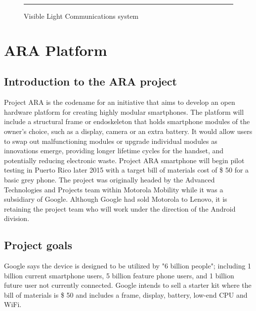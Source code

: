 \begin{figure}[ht]
  \centering
    \rule{35em}{0.5pt}
  \caption[VLC Receiver front-end circuit]{Visible Light Communications system}
  \label{fig:RxCircuit}
\end{figure}

\section{ARA Platform}
\subsection{Introduction to the ARA project}

Project ARA is the codename for an initiative that aims to develop an open hardware platform for creating highly modular smartphones. The platform will include a structural frame or endoskeleton that holds smartphone modules of the owner's choice, such as a display, camera or an extra battery. It would allow users to swap out malfunctioning modules or upgrade individual modules as innovations emerge, providing longer lifetime cycles for the handset, and potentially reducing electronic waste. Project ARA smartphone will begin pilot testing in Puerto Rico later 2015 with a target bill of materials cost of \$ 50 for a basic grey phone. The project was originally headed by the Advanced Technologies and Projects team within Motorola Mobility while it was a subsidiary of Google. Although Google had sold Motorola to Lenovo, it is retaining the project team who will work under the direction of the Android division.

\subsection{Project goals}
Google says the device is designed to be utilized by "6 billion people"; including 1 billion current smartphone users, 5 billion feature phone users, and 1 billion future user not currently connected. Google intends to sell a starter kit where the bill of materials is \$ 50 and includes a frame, display, battery, low-end CPU and WiFi.

